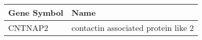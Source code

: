 \begin{tabular}{ll}
\toprule
Gene Symbol &                                Name \\
\midrule
    CNTNAP2 & contactin associated protein like 2 \\
\bottomrule
\end{tabular}
